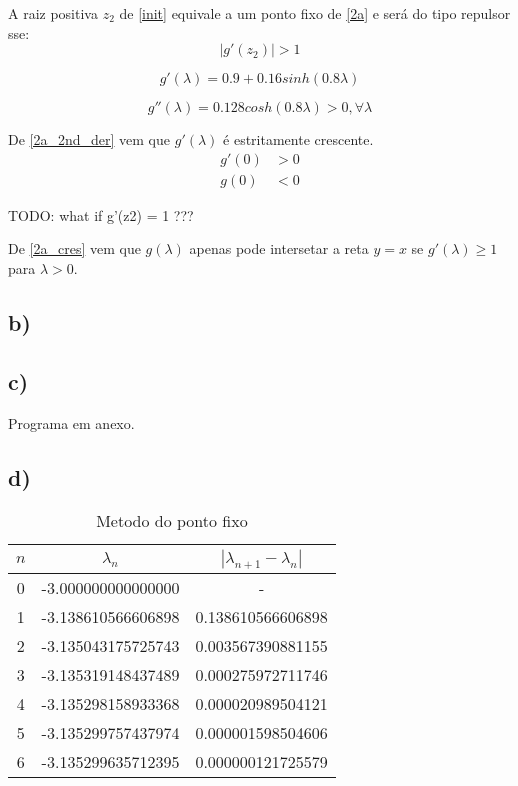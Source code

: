 \documentclass[a4paper, 12pt]{article}
\begin{document}
	\par
	A raiz positiva $z_2$ de \eqref{init} equivale a um ponto fixo de \eqref{2a} e será do tipo repulsor sse:
	$$|g'(z_2)| > 1$$

	\begin{equation}
		g'(\lambda) = 0.9 + 0.16sinh(0.8\lambda)
	\end{equation}

	\begin{equation} \label{2a_2nd_der}
		g''(\lambda) = 0.128cosh(0.8\lambda) > 0, \forall \lambda
	\end{equation}

	\par
	De \eqref{2a_2nd_der} vem que $g'(\lambda)$ é estritamente crescente.
	\begin{equation} \label{2a_cres}
	\begin{split}
		g'(0) &> 0 \\
		g(0) &< 0
	\end{split}
	\end{equation}

	TODO: what if g'(z2) = 1 ???
	\par
	De \eqref{2a_cres} vem que $g(\lambda)$ apenas pode intersetar a reta $y = x$ se $g'(\lambda) \geqslant 1$ para $\lambda > 0$.


\subsection*{b)}
\subsection*{c)}
	Programa em anexo.
\subsection*{d)}

\begin{table}[H] \label{pto_fixo}
\setlength{\tabcolsep}{0.5cm} %
\renewcommand{\arraystretch}{1.5} %
\centering
\caption{Metodo do ponto fixo}
\label{my-label}
\begin{tabular}{|c|c|c|}
 $n$ & $\lambda _n$ &  $| \lambda _{n+1} - \lambda _n |$ \\\hline
 0& -3.000000000000000 & -  \\
 1& -3.138610566606898 & 0.138610566606898 \\
 2& -3.135043175725743 & 0.003567390881155 \\
 3& -3.135319148437489 & 0.000275972711746 \\
 4& -3.135298158933368 & 0.000020989504121 \\
 5& -3.135299757437974 & 0.000001598504606 \\
 6& -3.135299635712395 & 0.000000121725579 \\
\end{tabular}
\end{table}
\end{document}
